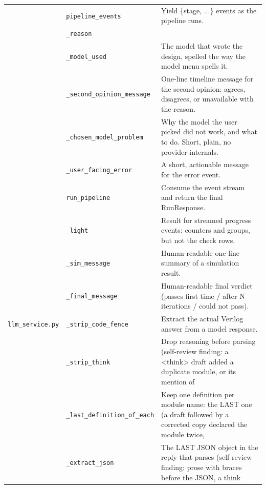 \begin{longtable}{@{}p{2.8cm}>{\raggedright\arraybackslash}p{4.6cm}p{7.9cm}@{}}
{\small } & \texttt{\small pipeline\_\allowbreak{}events} & Yield \{stage, ...\} events as the pipeline runs. \\
{\small } & \texttt{\small \_\allowbreak{}reason} &  \\
{\small } & \texttt{\small \_\allowbreak{}model\_\allowbreak{}used} & The model that wrote the design, spelled the way the model menu spells it. \\
{\small } & \texttt{\small \_\allowbreak{}second\_\allowbreak{}opinion\_\allowbreak{}message} & One-line timeline message for the second opinion: agrees, disagrees, or unavailable with the reason. \\
{\small } & \texttt{\small \_\allowbreak{}chosen\_\allowbreak{}model\_\allowbreak{}problem} & Why the model the user picked did not work, and what to do. Short, plain, no provider internals. \\
{\small } & \texttt{\small \_\allowbreak{}user\_\allowbreak{}facing\_\allowbreak{}error} & A short, actionable message for the error event. \\
{\small } & \texttt{\small run\_\allowbreak{}pipeline} & Consume the event stream and return the final RunResponse. \\
{\small } & \texttt{\small \_\allowbreak{}light} & Result for streamed progress events: counters and groups, but not the check rows. \\
{\small } & \texttt{\small \_\allowbreak{}sim\_\allowbreak{}message} & Human-readable one-line summary of a simulation result. \\
{\small } & \texttt{\small \_\allowbreak{}final\_\allowbreak{}message} & Human-readable final verdict (passes first time / after N iterations / could not pass). \\
{\small \nolinkurl{llm_service.py}} & \texttt{\small \_\allowbreak{}strip\_\allowbreak{}code\_\allowbreak{}fence} & Extract the actual Verilog answer from a model response. \\
{\small } & \texttt{\small \_\allowbreak{}strip\_\allowbreak{}think} & Drop reasoning before parsing (self-review finding: a \textless{}think\textgreater{} draft added a duplicate module, or its mention of \\
{\small } & \texttt{\small \_\allowbreak{}last\_\allowbreak{}definition\_\allowbreak{}of\_\allowbreak{}each} & Keep one definition per module name: the LAST one (a draft followed by a corrected copy declared the module twice, \\
{\small } & \texttt{\small \_\allowbreak{}extract\_\allowbreak{}json} & The LAST JSON object in the reply that parses (self-review finding: prose with braces before the JSON, a think \\

\end{longtable}
